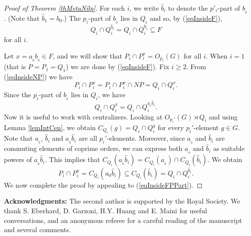 \documentclass[11pt]{amsart}
\numberwithin{equation}{section}
\theoremstyle{definition}
\theoremstyle{remark}
\begin{document}
\begin{proof}[Proof of Theorem \ref{thMetaNilp}]
For each $i$, we write $\hat{b}_i$ to denote the $p'_i$-part of $b_{_0}$.
(Note that $\hat{b}_1 = b_0$.)
The $p_i$-part of $b_{_0}$ lies in $Q_i$ and so, by (\ref{eqInsideF}),
\begin{equation} \label{eqInsideFPPart}
Q_i \cap Q_i^{\hat{b}_i} =
Q_i\cap Q_i^{b_{_0}} \subseteq F
\end{equation}
for all $i$. 

Let $x=a_{_0} b_{_0} \in F$, and we will show that $P_i \cap P_i^x = O_{p_i}(G)$ for all $i$.
When $i=1$ (that is $P=P_1=Q_1$) we are done by (\ref{eqInsideF}).
Fix $i \geq 2$.
From (\ref{eqInsideNP}) we have
$$ P_i \cap P_i^x = P_i \cap P_i^x \cap NP = Q_i \cap Q_i^x . $$
Since the $p_i$-part of $b_{_0}$ lies in $Q_i$, we have
$$ Q_i \cap Q_i^x =
Q_i \cap Q_i^{a_{_0} \hat{b}_i} . $$
Now it is useful to work with centralizers.
Looking at $O_{p_i'}(G) \rtimes Q_i$ and using Lemma \ref{lemIntCen},
we obtain $C_{Q_i}(g) =Q_i \cap Q_i^g$ for every $p_i'$-element $g \in G$.
Note that $a_{_0}$, $\hat{b}_i$ and $a_{_0} \hat{b}_i$ are all $p_i'$-elements.
Moreover, since $a_{_0}$ and $\hat{b}_i$ are commuting elements of coprime orders,
we can express both $a_{_0}$ and $\hat{b}_i$ as suitable powers of $a_{_0} \hat{b}_i$.
This implies that $C_{Q_i}(a_{_0} \hat{b}_i) = C_{Q_i}(a_{_0}) \cap C_{Q_i}(\hat{b}_i)$.
We obtain
$$ P_i \cap P_i^x = 
C_{Q_i}(a_0 \hat{b}_i) \subseteq 
C_{Q_i}(\hat{b}_i) =
Q_i \cap Q_i^{\hat{b}_i} . $$
We now complete the proof by appealing to (\ref{eqInsideFPPart}).
\end{proof}







\vspace{0.3cm} \noindent
 {\bfseries Acknowledgments:}
 The second author is supported by the Royal Society.
 We thank S. Eberhard, D. Garzoni, H.Y. Huang and E. Maini for useful conversations,
 and an anonymous referee for a careful reading of the manuscript and several comments.
\end{document}
